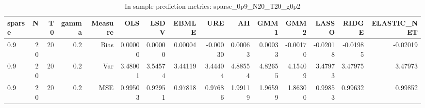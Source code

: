 \begin{table}[!htbp]\centering
\caption{In-sample prediction metrics: sparse_0p9_N20_T20_g0p2}
\label{tab:table2_sparse_0p9_N20_T20_g0p2}
\begin{tabular}{lrrrrrrrrrrrrrr}
\hline
sparse & N & T0 & gamma & Measure & OLS & LSDV & EBMLE & URE & AH & GMM1 & GMM2 & LASSO & RIDGE & ELASTIC_NET \\
\hline
0.9 & 20 & 20 & 0.2 & Bias & 0.00000 & 0.00000 & 0.00004 & -0.00030 & 0.00063 & 0.00033 & -0.00170 & -0.02018 & -0.01985 & -0.02019 \\
0.9 & 20 & 20 & 0.2 & Var & 3.48001 & 3.54574 & 3.44119 & 3.44404 & 4.88554 & 4.82655 & 4.15409 & 3.47973 & 3.47975 & 3.47973 \\
0.9 & 20 & 20 & 0.2 & MSE & 0.99503 & 0.92951 & 0.97818 & 0.97686 & 1.99119 & 1.96599 & 1.86300 & 0.99853 & 0.99632 & 0.99852 \\
\hline
\end{tabular}
\end{table}

